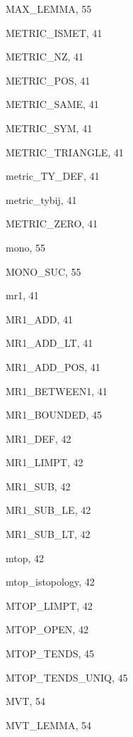 \begin{theindex}
  \item {\ptt MAX\_LEMMA}, 55
  \item {\ptt METRIC\_ISMET}, 41
  \item {\ptt METRIC\_NZ}, 41
  \item {\ptt METRIC\_POS}, 41
  \item {\ptt METRIC\_SAME}, 41
  \item {\ptt METRIC\_SYM}, 41
  \item {\ptt METRIC\_TRIANGLE}, 41
  \item {\ptt metric\_TY\_DEF}, 41
  \item {\ptt metric\_tybij}, 41
  \item {\ptt METRIC\_ZERO}, 41
  \item {\ptt mono}, 55
  \item {\ptt MONO\_SUC}, 55
  \item {\ptt mr1}, 41
  \item {\ptt MR1\_ADD}, 41
  \item {\ptt MR1\_ADD\_LT}, 41
  \item {\ptt MR1\_ADD\_POS}, 41
  \item {\ptt MR1\_BETWEEN1}, 41
  \item {\ptt MR1\_BOUNDED}, 45
  \item {\ptt MR1\_DEF}, 42
  \item {\ptt MR1\_LIMPT}, 42
  \item {\ptt MR1\_SUB}, 42
  \item {\ptt MR1\_SUB\_LE}, 42
  \item {\ptt MR1\_SUB\_LT}, 42
  \item {\ptt mtop}, 42
  \item {\ptt mtop\_istopology}, 42
  \item {\ptt MTOP\_LIMPT}, 42
  \item {\ptt MTOP\_OPEN}, 42
  \item {\ptt MTOP\_TENDS}, 45
  \item {\ptt MTOP\_TENDS\_UNIQ}, 45
  \item {\ptt MVT}, 54
  \item {\ptt MVT\_LEMMA}, 54

  \indexspace


\end{theindex}
